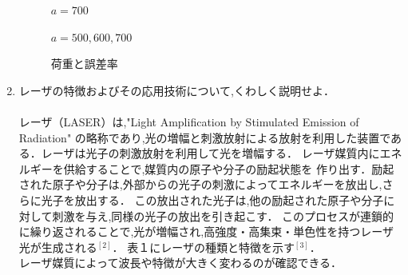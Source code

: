 \documentclass[a4paper,12pt]{jsarticle}
\begin{document}
\begin{enumerate}
\begin{figure}[h]
  \caption{$a = 700$}
\end{figure}
\clearpage
\begin{figure}[h]
  \centering
  \caption{$a = 500,600,700$}
\end{figure}
\clearpage
\begin{figure}[h]
  \centering
  \caption{荷重と誤差率}
\end{figure}
\clearpage
\item レーザの特徴およびその応用技術について,くわしく説明せよ．\\
\\
\quad レーザ（LASER）は,"Light Amplification by Stimulated Emission of Radiation" 
の略称であり,光の増幅と刺激放射による放射を利用した装置である．レーザは光子の刺激放射を利用して光を増幅する．
レーザ媒質内にエネルギーを供給することで,媒質内の原子や分子の励起状態を
作り出す．励起された原子や分子は,外部からの光子の刺激によってエネルギーを放出し,さらに光子を放出する．
この放出された光子は,他の励起された原子や分子に対して刺激を与え,同様の光子の放出を引き起こす．
このプロセスが連鎖的に繰り返されることで,光が増幅され,高強度・高集束・単色性を持つレーザ光が生成される$^{[2]}$．
表１にレーザの種類と特徴を示す$^{[3]}$．\\レーザ媒質によって波長や特徴が大きく変わるのが確認できる．



\end{enumerate}
\end{document}
